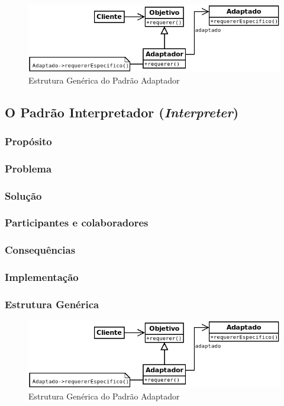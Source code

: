\begin{figure}[h]
\begin{center}
\includegraphics[scale=0.6]{adaptador.png}
\caption{Estrutura Genérica do Padrão Adaptador}\label{fig:adaptador}
\end{center}
\end{figure}

\subsection{O Padrão Interpretador (\textit{Interpreter})}
\subsubsection{Propósito}
\subsubsection{Problema}
\subsubsection{Solução}
\subsubsection{Participantes e colaboradores}
\subsubsection{Consequências}
\subsubsection{Implementação}
\subsubsection{Estrutura Genérica}

\begin{figure}[h]
\begin{center}
\includegraphics[scale=0.6]{adaptador.png}
\caption{Estrutura Genérica do Padrão Adaptador}\label{fig:adaptador}
\end{center}
\end{figure}

